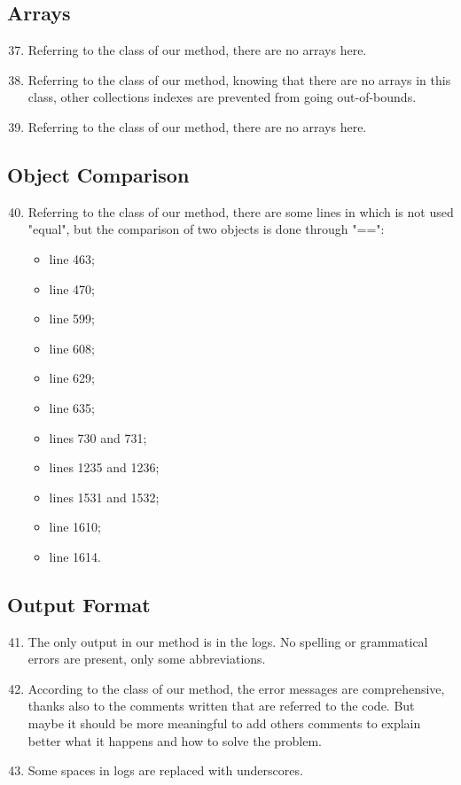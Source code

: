 \subsection{Arrays}
\begin{enumerate}
	\setcounter{enumi}{36}
	\item Referring to the class of our method, there are no arrays here.
	\item Referring to the class of our method, knowing that there are no arrays in this class, other collections indexes are prevented from going out-of-bounds.
	\item Referring to the class of our method, there are no arrays here.
\end{enumerate}
\subsection{Object Comparison}
\begin{enumerate}
	\setcounter{enumi}{39}
	\item Referring to the class of our method, there are some lines in which is not used "equal", but the comparison of two objects is done through "==": 
	    \begin{itemize}
	        \item line 463;
	        \item line 470;
	        \item line 599;
	        \item line 608;
	        \item line 629;
	        \item line 635;
	        \item lines 730 and 731;
	        \item lines 1235 and 1236;
	        \item lines 1531 and 1532;
	        \item line 1610;
	        \item line 1614.
	    \end{itemize}
\end{enumerate}
\subsection{Output Format}
\begin{enumerate}
	\setcounter{enumi}{40}
	\item The only output in our method is in the logs. No spelling or grammatical errors are present, only some abbreviations.
	\item According to the class of our method, the error messages are comprehensive, thanks also to the comments written that are referred to the code. But maybe it should be more meaningful to add others comments to explain better what it happens and how to solve the problem.
	\item Some spaces in logs are replaced with underscores.
\end{enumerate}
